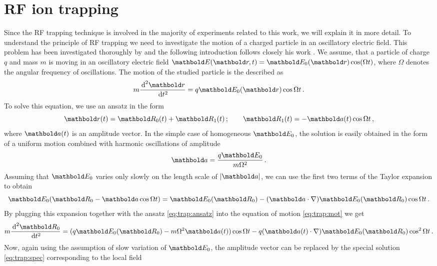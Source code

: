 \section{RF ion trapping}
Since the RF trapping technique is involved in the majority
of experiments related to this work, we will explain it in more
detail.
To understand the principle of RF trapping we need to investigate
the motion of a charged particle in an oscillatory electric field.
This problem has been investigated thoroughly by \cite{gerlich1992}
and the following introduction follows closely his work \citep{gerlich1992}.
We assume, that a particle of charge $q$ and mass $m$ is moving
in an
oscillatory electric field
$\mb E(\mb r, t) = \mb E_0(\mb r)\cos(\Omega t)$,
where $\Omega$ denotes the angular frequency of oscillations.
The motion of the studied particle is the described as
\begin{equation}
m\frac{\de^2 \mb r}{\de t^2} = 
q\mb E_0(\mb r)\cos\Omega t\,.
\label{eq:trap:mot}
\end{equation}
To solve this equation, we use an ansatz in the form
\begin{equation}
\mb r(t) = \mb R_0(t) + \mb R_1(t)\,;\qquad \mb R_1(t) = -\mb a(t)\cos\Omega t\,,
\label{eq:trap:ansatz}
\end{equation}
where $\mb a(t)$ is an amplitude vector.
In the simple case of homogeneous $\mb E_0$,
the solution is easily obtained in the form of
 a uniform motion combined with harmonic
oscillations of amplitude
\begin{equation}
\mb a = \frac{q\mb E_0}{m\Omega^2}\,.
\label{eq:trap:spec}
\end{equation}
Assuming that $\mb E_0$
varies only slowly on the length scale of $|\mb a|$, we can use
the first two terms of the Taylor expansion to obtain 
\begin{equation}
\mb E_0(\mb R_0-\mb a\cos\Omega t) = \mb E_0(\mb R_0) -
(\mb a\cdot\nabla)\mb E_0(\mb R_0)\cos \Omega t\,.
\end{equation}
By plugging this expansion together with the ansatz \eqref{eq:trap:ansatz}
into the equation of motion \eqref{eq:trap:mot} we get
\begin{equation}
m\frac{\de^2\mb R_0}{\de t^2} =
(q\mb E_0(\mb R_0) - 
 m\Omega^2\mb a(t))\cos\Omega t -
q(\mb a(t)\cdot\nabla)\mb E_0(\mb R_0)\cos^2\Omega t\,.
\end{equation}
Now, again using the assumption of slow variation of $\mb E_0$,
the amplitude vector can be replaced by the special solution
\eqref{eq:trap:spec} corresponding to the local field \ie\
